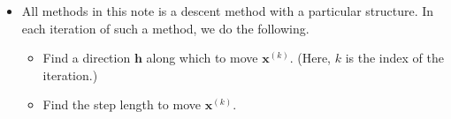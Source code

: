 \documentclass[10pt]{article}
\newcommand{\ve}[1]{\mathbf{#1}}
\begin{document}
\begin{itemize}
    \item All methods in this note is a descent method with a particular structure. In each iteration of such a method, we do the following.
    \begin{itemize}
        \item Find a direction $\ve{h}$ along which to move $\ve{x}^{(k)}$. (Here, $k$ is the index of the iteration.)
        \item Find the step length to move $\ve{x}^{(k)}$.
    \end{itemize}
\end{itemize}




\end{document}
